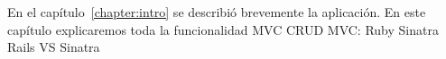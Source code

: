 
En el capítulo~\ref{chapter:intro} se describió brevemente la aplicación. En este capítulo explicaremos toda la funcionalidad 
MVC
CRUD
MVC: Ruby Sinatra
Rails VS Sinatra
